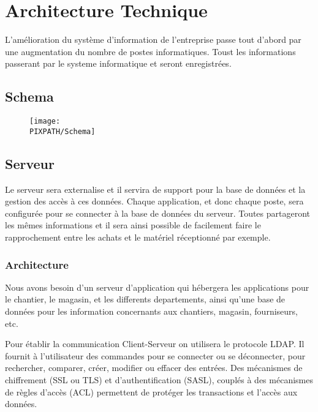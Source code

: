 \documentclass [a4paper] {report}
\begin{document}
\section{Architecture Technique}
L’amélioration du système d’information de l’entreprise passe tout d’abord par une augmentation du nombre de postes
informatiques. Toust les informations passerant par le systeme informatique et seront enregistrées.

\subsection{Schema}

 \begin{figure}[!h]
    \begin{center}
    \texttt{[image: \\PIXPATH/Schema]}
    \caption{}
    \end{center}
    \end{figure}


\subsection{Serveur}

Le serveur sera externalise et il servira de support pour la base de données et la gestion des accès à ces données. 
Chaque application, et donc chaque poste, sera configurée pour se connecter à la base de données du serveur. 
Toutes partageront les mêmes informations et il sera ainsi possible de facilement faire le rapprochement entre 
les achats et le matériel réceptionné par exemple.

	\subsubsection{Architecture}
Nous avons besoin d'un serveur d'application qui hébergera les applications pour le chantier, le magasin, et les differents 
departements,  ainsi qu'une base de données pour les information concernants aux chantiers, magasin, fourniseurs, etc. 

Pour établir la communication Client-Serveur on utilisera le protocole LDAP. Il fournit à l'utilisateur des commandes 
pour se connecter ou se déconnecter,  pour rechercher, comparer, créer, modifier ou effacer des entrées. 
Des mécanismes de chiffrement (SSL ou TLS) et d'authentification (SASL), couplés à des mécanismes de règles d'accès (ACL) 
permettent de protéger les transactions et l'accès aux données.
\end{document}
